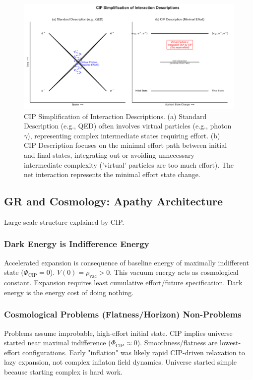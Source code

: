 \documentclass[11pt, a4paper]{article}
\newcommand{\subt}[1]{\mathrm{#1}}
\begin{document}
\begin{figure}[H]
    \centering
    \includegraphics[width=\textwidth]{CIP_Interactions.png}
    \caption[CIP Simplification of Interaction Descriptions]{CIP Simplification of Interaction Descriptions. (a) Standard Description (e.g., QED) often involves virtual particles (e.g., photon $\gamma$), representing complex intermediate states requiring effort. (b) CIP Description focuses on the minimal effort path between initial and final states, integrating out or avoiding unnecessary intermediate complexity ('virtual' particles are too much effort). The net interaction represents the minimal effort state change.}
    \label{fig:interactions}
\end{figure}

\subsection{GR and Cosmology: Apathy Architecture}

Large-scale structure explained by CIP.

\subsubsection{Dark Energy is Indifference Energy}
Accelerated expansion is consequence of baseline energy of maximally indifferent state ($\Phi_{\subt{CIP}}=0$). $V(0) = \rho_{\subt{vac}} > 0$. This vacuum energy acts as cosmological constant. Expansion requires least cumulative effort/future specification. Dark energy is the energy cost of doing nothing.

\subsubsection{Cosmological Problems (Flatness/Horizon) Non-Problems}
Problems assume improbable, high-effort initial state. CIP implies universe started near maximal indifference ($\Phi_{\subt{CIP}} \approx 0$). Smoothness/flatness are lowest-effort configurations. Early "inflation" was likely rapid CIP-driven relaxation to lazy expansion, not complex inflaton field dynamics. Universe started simple because starting complex is hard work.
\end{document}
